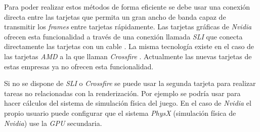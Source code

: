 \begin{pregunta}
Para poder realizar estos métodos de forma eficiente se debe usar
una conexión directa entre las tarjetas que permita un gran ancho de banda capaz
de transmitir los \emph{frames} entre tarjetas rápidamente. Las tarjetas
gráficas de \emph{Nvidia} ofrecen esta funcionalidad a través de una conexión
llamada \emph{SLI} que conecta directamente las tarjetas con un cable
\cite{noauthor_sli_nodate}. La misma
tecnología existe en el caso de las tarjetas \emph{AMD} a la que llaman
\emph{Crossfire} \cite{noauthor_amd_nodate}. Actualmente las nuevas tarjetas de
estas empresas ya no ofrecen esta funcionalidad.

Si no se dispone de \emph{SLI} o \emph{Crossfire} se puede usar la segunda
tarjeta para realizar tareas no relacionadas con la renderizaci\'on. Por ejemplo
se podría usar para hacer cálculos del sistema de simulación física del juego.
En el caso de \emph{Nvidia} el propio usuario puede configurar que el sistema
\emph{PhysX} (simulación física de \emph{Nvidia}) use la \emph{GPU} secundaria.



\end{pregunta}
